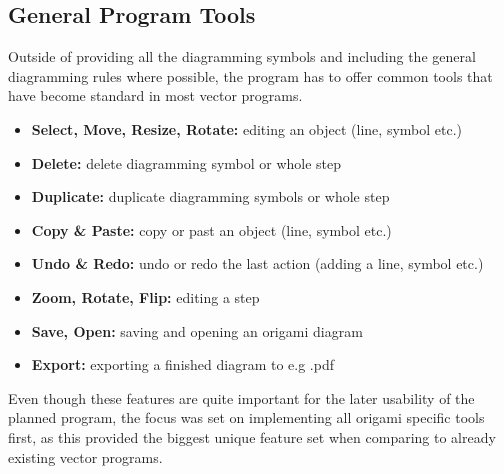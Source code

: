 \subsection{General Program Tools}

Outside of providing all the diagramming symbols and including the general diagramming rules where possible, the program has to offer common tools that have become standard in most vector programs.\\
\begin{itemize}
	\item \textbf{Select, Move, Resize, Rotate:} editing an object (line, symbol etc.)
	\item \textbf{Delete:} delete diagramming symbol or whole step
	\item \textbf{Duplicate:} duplicate diagramming symbols or whole step
	\item \textbf{Copy \& Paste:} copy or past an object (line, symbol etc.)
	\item \textbf{Undo \& Redo:} undo or redo the last action (adding a line, symbol etc.)
	\item \textbf{Zoom, Rotate, Flip:} editing a step
	\item \textbf{Save, Open:} saving and opening an origami diagram
	\item \textbf{Export:} exporting a finished diagram to e.g .pdf
\end{itemize}
Even though these features are quite important for the later usability of the planned program, the focus was set on implementing all origami specific tools first, as this provided the biggest unique feature set when comparing to already existing vector programs.